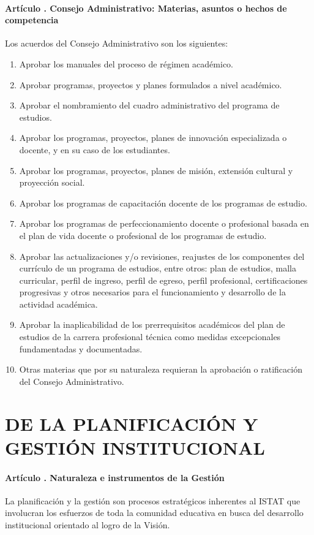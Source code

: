 \subsection{Artículo . Consejo Administrativo: Materias, asuntos o hechos de competencia}
\addtocounter{ns}{1}
Los acuerdos del Consejo Administrativo son los siguientes: 
\begin{enumerate}
\item Aprobar los manuales del proceso de régimen académico.
\item Aprobar programas, proyectos y planes formulados a nivel académico. 
\item Aprobar el nombramiento del cuadro administrativo del programa de estudios. 
\item Aprobar los programas, proyectos, planes de innovación especializada o docente, y en su caso de los estudiantes. 
\item Aprobar los programas, proyectos, planes de misión, extensión cultural y proyección social. 
\item Aprobar los programas de capacitación docente de los programas de estudio. 
\item Aprobar los programas de perfeccionamiento docente o profesional basada en el plan de vida docente o profesional de los programas de estudio. 
\item Aprobar las actualizaciones y/o revisiones, reajustes de los componentes del currículo de un programa de estudios, entre otros: plan de estudios, malla curricular, perfil de ingreso, perfil de egreso, perfil profesional, certificaciones progresivas y otros necesarios para el funcionamiento y desarrollo de la actividad académica. 
\item Aprobar la inaplicabilidad de los prerrequisitos académicos del plan de estudios de la carrera profesional técnica como medidas excepcionales fundamentadas y documentadas. 
\item Otras materias que por su naturaleza requieran la aprobación o ratificación del Consejo Administrativo. 
\end{enumerate}
\part{DE LA PLANIFICACIÓN Y GESTIÓN INSTITUCIONAL}
\subsection{Artículo . Naturaleza e instrumentos de la Gestión}
\addtocounter{ns}{1}
La planificación y la gestión son procesos estratégicos inherentes al ISTAT que involucran los esfuerzos de toda la comunidad educativa en busca del desarrollo institucional orientado al logro de la Visión. 

